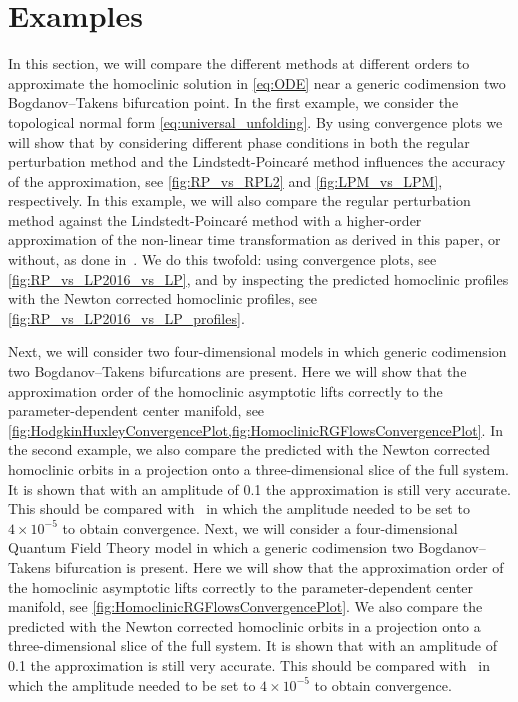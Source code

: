 \section{Examples}
\label{sec:examples}

In this section, we will compare the different methods at different orders to
approximate the homoclinic solution in \cref{eq:ODE} near a generic codimension two
Bogdanov--Takens bifurcation point. In the first example, we consider the
topological normal form \cref{eq:universal_unfolding}. By using convergence plots
we will show that by consi\-de\-ring different phase conditions in both the regular
perturbation method and the Lindstedt-Poincar\'e method influences the accuracy
of the approximation, see \cref{fig:RP_vs_RPL2} and \cref{fig:LPM_vs_LPM},
respectively. In this example, we will also compare the regular perturbation
method against the Lindstedt-Poincar\'e method with a higher-order
approximation of the non-linear time transformation as derived
in this paper, or without, as done in~\cite{Al-Hdaibat2016}. We do this twofold:
using convergence plots, see \cref{fig:RP_vs_LP2016_vs_LP}, and by inspecting
the predicted homoclinic profiles with the Newton corrected homoclinic
profiles, see \cref{fig:RP_vs_LP2016_vs_LP_profiles}.

\ifthesis
Next, we will consider two four-dimensional models in which generic codimension
two Bogdanov--Takens bifurcations are present. Here we will show that the
approximation order of the homoclinic asymptotic lifts correctly to the
parameter-dependent center manifold, see
\cref{fig:HodgkinHuxleyConvergencePlot,fig:HomoclinicRGFlowsConvergencePlot}. In the
second example, we also compare the predicted with the Newton corrected
homoclinic orbits in a projection onto a three-dimensional slice of the full
system. It is shown that with an amplitude of 0.1 the approximation is still
very accurate. This should be compared with~\cite[section 6.2]{Al-Hdaibat2016}
in which the amplitude needed to be set to $4\times 10^{-5}$ to obtain
convergence.
\else
Next, we will consider a four-dimensional Quantum Field Theory model in which a
generic codimension two Bogdanov--Takens bifurcation is present. Here we will
show that the approximation order of the homoclinic asymptotic lifts correctly
to the parameter-dependent center manifold, see
\cref{fig:HomoclinicRGFlowsConvergencePlot}. We also compare the predicted with
the Newton corrected homoclinic orbits in a projection onto a three-dimensional
slice of the full system. It is shown that with an amplitude of 0.1 the
approximation is still very accurate. This should be compared
with~\cite[section 6.2]{Al-Hdaibat2016} in which the amplitude needed to be set
to $4\times 10^{-5}$ to obtain convergence.
\fi

